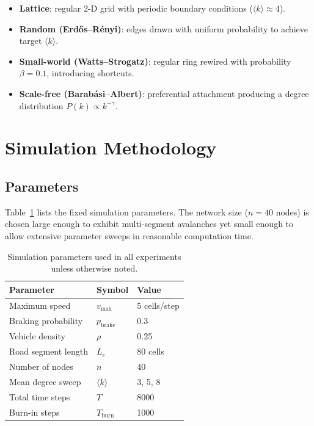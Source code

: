 \documentclass[12pt,a4paper]{article}
\begin{document}
\begin{itemize}
  \item \textbf{Lattice}: regular 2-D grid with periodic boundary 
        conditions ($\langle k \rangle \approx 4$).
  \item \textbf{Random (Erdős–Rényi)}: edges drawn with uniform 
        probability to achieve target $\langle k \rangle$.
  \item \textbf{Small-world (Watts–Strogatz)}: regular ring rewired 
        with probability $\beta = 0.1$, introducing shortcuts.
  \item \textbf{Scale-free (Barabási–Albert)}: preferential attachment 
        producing a degree distribution $P(k) \propto k^{-\gamma}$.
\end{itemize}

\section{Simulation Methodology}
\label{sec:sim}

\subsection{Parameters}
\label{subsec:params}

Table~\ref{tab:params} lists the fixed simulation parameters. The 
network size ($n = 40$ nodes) is chosen large enough to exhibit 
multi-segment avalanches yet small enough to allow extensive parameter 
sweeps in reasonable computation time.

\begin{table}[H]
  \centering
  \caption{Simulation parameters used in all experiments unless 
  otherwise noted.}
  \label{tab:params}
  \begin{tabular}{lll}
    \toprule
    Parameter & Symbol & Value \\
    \midrule
    Maximum speed        & $v_\text{max}$    & 5 cells/step \\
    Braking probability  & $p_\text{brake}$  & 0.3 \\
    Vehicle density      & $\rho$            & 0.25 \\
    Road segment length  & $L_e$             & 80 cells \\
    Number of nodes      & $n$               & 40 \\
    Mean degree sweep    & $\langle k \rangle$ & 3, 5, 8 \\
    Total time steps     & $T$               & 8000 \\
    Burn-in steps        & $T_\text{burn}$   & 1000 \\
    \bottomrule
  \end{tabular}
\end{table}
\end{document}

